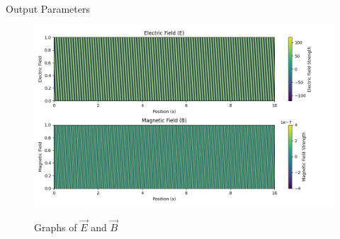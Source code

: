 \documentclass[journal,12pt,twocolumn]{IEEEtran}
\theoremstyle{remark}
\begin{document}
\bigskip

\begin{center}
    \begin{table}[h]
        \caption{Output Parameters}
        
        \label{tab:table2.12.8.8}
    \end{table}
\end{center}

\renewcommand{\thefigure}{\theenumi}
\renewcommand{\thetable}{\theenumi}

\newpage

\begin{center}
\begin{figure}[h]
\renewcommand\thefigure{1}
  \caption{Graphs of $\vec{E}$ and $\vec{B}$}
  \includegraphics[width=1\textwidth]{figs/Figure1_12.8_8.png}
  \label{fig:graphs}
\end{figure}
\end{center}
\end{document}
